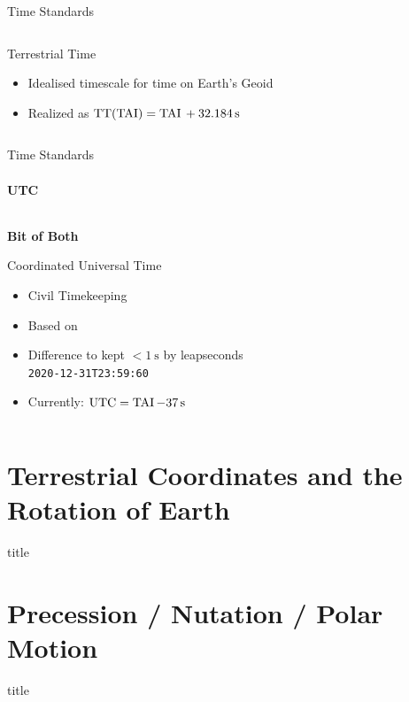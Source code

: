 \documentclass[aspectratio=1610, 9pt]{beamer}
\begin{document}
\begin{frame}{Time Standards}
\begin{columns}[t, onlytextwidth]
\begin{column}{0.495\textwidth}
\begin{center}
\begin{description}[TAI]
          \item[TT] Terrestrial Time
            \begin{itemize}
              \item Idealised timescale for time on Earth's Geoid
              \item Realized as $\operatorname{TT}(\operatorname{TAI}) = \operatorname{TAI}{} + \SI{32.184}{\second}$
            \end{itemize}
        \end{description}
      \end{center}
    \end{column}
  \end{columns}
\end{frame}

\begin{frame}{Time Standards}
  \framesubtitle{UTC}
  \begin{columns}[t, onlytextwidth]
    \hfill
    \begin{column}{0.5\textwidth}
      \centering
      \textbf{\Large Bit of Both}\\[0.5\baselineskip]%
      \begin{description}[UTC]
        \item[UTC] Coordinated Universal Time
        \begin{itemize}
          \item Civil Timekeeping
          \item Based on \TAI
          \item Difference to \UT{} kept $<\SI{1}{\second}$ by leapseconds \\
            \texttt{2020-12-31T23:59:60}
          \item Currently: $\operatorname{UTC} = \operatorname{TAI} - \SI{37}{\second}$
        \end{itemize}
      \end{description}
    \end{column}
    \hfill
  \end{columns}
\end{frame}

\section{Terrestrial Coordinates and the Rotation of Earth}
\begin{frame}{title}
\end{frame}

\section{Precession / Nutation / Polar Motion}
\begin{frame}{title}
\end{frame}
\end{document}
